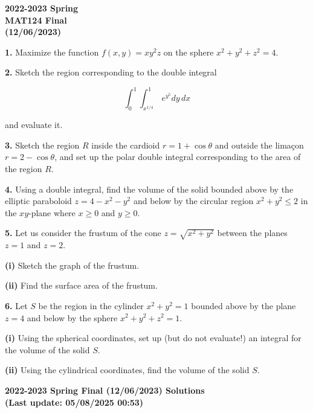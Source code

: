 \documentclass{article}
\begin{document}
\pagestyle{empty}
\large

\begin{center}
\textbf{2022-2023 Spring \\MAT124 Final\\(12/06/2023)}
\end{center}

\textbf{1.} Maximize the function $f(x,y)=xy^2z$ on the sphere $x^2+y^2+z^2 = 4$.

\vspace{1em}

\textbf{2.} Sketch the region corresponding to the double integral

\[\int_0^1\int_{x^{1/4}}^1\,{e}^{y^5}dy\,dx\]

and evaluate it.

\vspace{1em}

\textbf{3.} Sketch the region $R$ inside the cardioid $r=1+\cos\theta$ and outside the limaçon $r=2-\cos\theta$, and set up the polar double integral corresponding to the area of the region $R$.

\vspace{1em}

\textbf{4.} Using a double integral, find the volume of the solid bounded above by the elliptic paraboloid $z=4-x^2-y^2$ and below by the circular region $x^2+y^2\leq2$ in the $xy$-plane where $x\geq0$ and $y\geq0$.

\vspace{1em}

\textbf{5.} Let us consider the frustum of the cone $z=\sqrt{x^2+y^2}$ between the planes $z=1$ and $z=2$.

\textbf{(i)} Sketch the graph of the frustum.

\textbf{(ii)} Find the surface area of the frustum.

\vspace{1em}

\textbf{6.} Let $S$ be the region in the cylinder $x^2+y^2 = 1$ bounded above by the plane $z=4$ and below by the sphere $x^2+y^2+z^2=1$.

\textbf{(i)} Using the spherical coordinates, set up (but do not evaluate!) an integral for the volume of the solid $S$.

\textbf{(ii)} Using the cylindrical coordinates, find the volume of the solid $S$.

\newpage

\begin{center}
\textbf{2022-2023 Spring Final (12/06/2023) Solutions\\
(Last update: 05/08/2025 00:53)}
\end{center}
\end{document}
